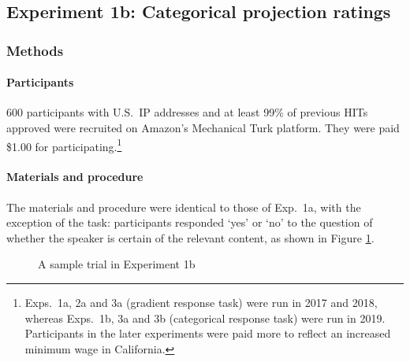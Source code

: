 \documentclass[11pt,fleqn]{article}
\newcommand{\6}{\mbox{$[\hspace*{-.6mm}[$}}
\newcommand{\9}{\mbox{$]\hspace*{-.6mm}]$}}
\begin{document}
\subsection{Experiment 1b: Categorical projection ratings}

\subsubsection{Methods}

\paragraph{Participants} 600 participants with U.S.\ IP addresses and at least 99\% of previous HITs approved were recruited on Amazon's Mechanical Turk platform. They were paid \$1.00 for participating.\footnote{Exps.~1a, 2a and 3a (gradient response task) were run in 2017 and 2018, whereas  Exps.~1b, 3a and 3b (categorical response task) were run in 2019. Participants in the later experiments were paid more to reflect an increased minimum wage in California.}


\paragraph{Materials and procedure} The materials and procedure were identical to those of Exp.~1a, with the exception of the task: participants responded `yes' or `no' to the question of whether the speaker is certain of the relevant content, as shown in Figure \ref{fig-trial-exp1b}.

\begin{figure}[h!]
\begin{center}
\end{center}
\caption{A sample trial in Experiment 1b}\label{fig-trial-exp1b}
\end{figure}
\end{document}

